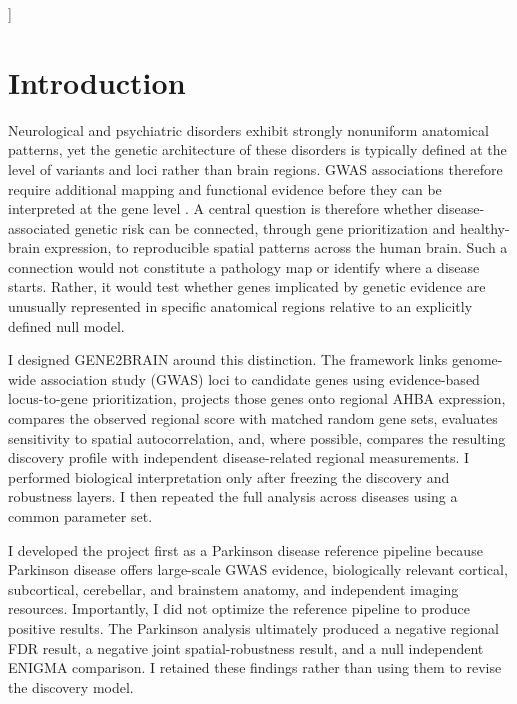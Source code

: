 \documentclass[10pt,twocolumn]{article}
\begin{document}
\vspace{0.6em}
]

\section{Introduction}

Neurological and psychiatric disorders exhibit strongly nonuniform anatomical patterns, yet the genetic architecture of these disorders is typically defined at the level of variants and loci rather than brain regions. GWAS associations therefore require additional mapping and functional evidence before they can be interpreted at the gene level \cite{mountjoy2021l2g,sollis2023gwascatalog}. A central question is therefore whether disease-associated genetic risk can be connected, through gene prioritization and healthy-brain expression, to reproducible spatial patterns across the human brain. Such a connection would not constitute a pathology map or identify where a disease starts. Rather, it would test whether genes implicated by genetic evidence are unusually represented in specific anatomical regions relative to an explicitly defined null model.

I designed GENE2BRAIN around this distinction. The framework links genome-wide association study (GWAS) loci to candidate genes using evidence-based locus-to-gene prioritization, projects those genes onto regional AHBA expression, compares the observed regional score with matched random gene sets, evaluates sensitivity to spatial autocorrelation, and, where possible, compares the resulting discovery profile with independent disease-related regional measurements. I performed biological interpretation only after freezing the discovery and robustness layers. I then repeated the full analysis across diseases using a common parameter set.

I developed the project first as a Parkinson disease reference pipeline because Parkinson disease offers large-scale GWAS evidence, biologically relevant cortical, subcortical, cerebellar, and brainstem anatomy, and independent imaging resources. Importantly, I did not optimize the reference pipeline to produce positive results. The Parkinson analysis ultimately produced a negative regional FDR result, a negative joint spatial-robustness result, and a null independent ENIGMA comparison. I retained these findings rather than using them to revise the discovery model.
\end{document}
